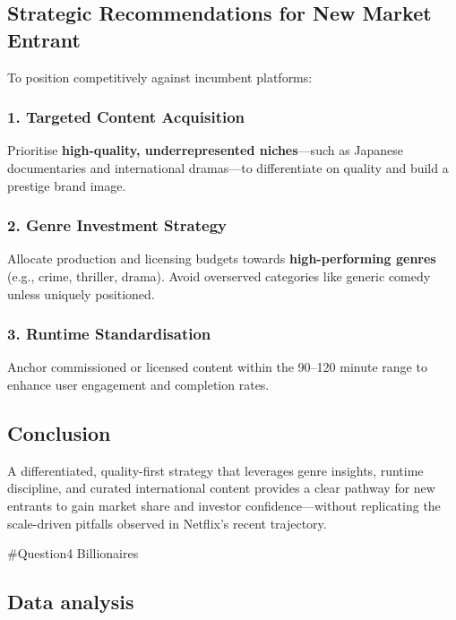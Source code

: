 \documentclass[
  man,floatsintext]{apa6}
\begin{document}
\subsection{Strategic Recommendations for New Market Entrant}\label{strategic-recommendations-for-new-market-entrant}

To position competitively against incumbent platforms:

\subsubsection{1. Targeted Content Acquisition}\label{targeted-content-acquisition}

Prioritise \textbf{high-quality, underrepresented niches}---such as Japanese documentaries and international dramas---to differentiate on quality and build a prestige brand image.

\subsubsection{2. Genre Investment Strategy}\label{genre-investment-strategy}

Allocate production and licensing budgets towards \textbf{high-performing genres} (e.g., crime, thriller, drama). Avoid overserved categories like generic comedy unless uniquely positioned.

\subsubsection{3. Runtime Standardisation}\label{runtime-standardisation}

Anchor commissioned or licensed content within the 90--120 minute range to enhance user engagement and completion rates.

\subsection{Conclusion}\label{conclusion}

A differentiated, quality-first strategy that leverages genre insights, runtime discipline, and curated international content provides a clear pathway for new entrants to gain market share and investor confidence---without replicating the scale-driven pitfalls observed in Netflix's recent trajectory.

\#Question4 Billionaires

\subsection{Data analysis}\label{data-analysis}
\end{document}
